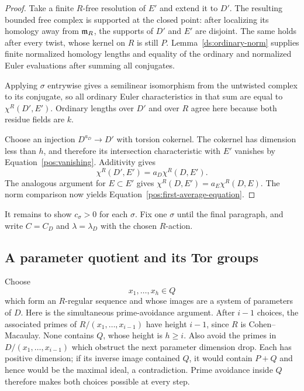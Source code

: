 \begin{proof}
Take a finite $R$-free resolution of $E'$ and extend it to $D'$.
The resulting bounded free complex is supported at the closed point:
after localizing its homology away from $\mathfrak{m}_R$, the supports of
$D'$ and $E'$ are disjoint.  The same holds after every twist, whose
kernel on $R$ is still $P$.  Lemma~\ref{ds:ordinary-norm} supplies
finite normalized homology lengths and equality of the ordinary and
normalized Euler evaluations after summing all conjugates.

Applying $\sigma$ entrywise gives a semilinear isomorphism from the
untwisted complex to its conjugate, so all ordinary Euler
characteristics in that sum are equal to $\chi^R(D',E')$.  Ordinary
lengths over $D'$ and over $R$ agree here because both residue fields
are $k$.

Choose an injection $D^{a_D}\to D'$ with torsion cokernel.  The
cokernel has dimension less than $h$, and therefore its intersection
characteristic with $E'$ vanishes by Equation~\eqref{pos:vanishing}.
Additivity gives
\[
 \chi^R(D',E')=a_D\chi^R(D,E').
\]
The analogous argument for $E\subset E'$ gives
$\chi^R(D,E')=a_E\chi^R(D,E)$.  The norm comparison now yields
Equation~\eqref{pos:first-average-equation}.
\end{proof}

It remains to show $c_\sigma>0$ for each $\sigma$.  Fix one
$\sigma$ until the final paragraph, and write $C=C_D$ and
$\lambda=\lambda_D$ with the chosen $R$-action.

\subsection{A parameter quotient and its Tor groups}

Choose
\begin{equation}\label{pos:parameters}
 x_1,\ldots,x_h\in Q
\end{equation}
which form an $R$-regular sequence and whose images are a system of
parameters of $D$.  Here is the simultaneous prime-avoidance
argument.  After $i-1$ choices, the associated primes of
$R/(x_1,\ldots,x_{i-1})$ have height $i-1$, since $R$ is
Cohen--Macaulay.  None contains $Q$, whose height is $h\ge i$.
Also avoid the primes in $D/(x_1,\ldots,x_{i-1})$ which obstruct the
next parameter dimension drop.  Each has positive dimension; if its
inverse image contained $Q$, it would contain $P+Q$ and hence would
be the maximal ideal, a contradiction.  Prime avoidance inside $Q$
therefore makes both choices possible at every step.

